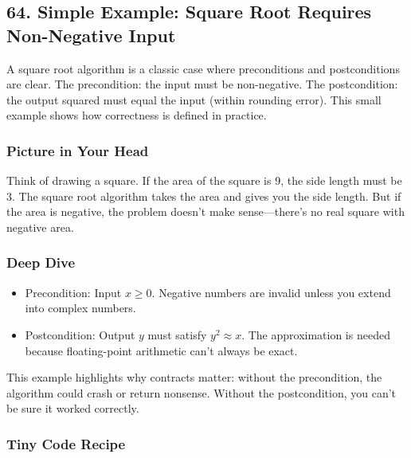 \documentclass[
  letterpaper,
  DIV=11,
  numbers=noendperiod]{scrreprt}
\providecommand{\tightlist}{%
  \setlength{\itemsep}{0pt}\setlength{\parskip}{0pt}}
\begin{document}
\subsection{64. Simple Example: Square Root Requires Non-Negative
Input}\label{simple-example-square-root-requires-non-negative-input}

A square root algorithm is a classic case where preconditions and
postconditions are clear. The precondition: the input must be
non-negative. The postcondition: the output squared must equal the input
(within rounding error). This small example shows how correctness is
defined in practice.

\subsubsection{Picture in Your Head}\label{picture-in-your-head-63}

Think of drawing a square. If the area of the square is 9, the side
length must be 3. The square root algorithm takes the area and gives you
the side length. But if the area is negative, the problem doesn't make
sense---there's no real square with negative area.

\subsubsection{Deep Dive}\label{deep-dive-33}

\begin{itemize}
\tightlist
\item
  Precondition: Input \(x \geq 0\). Negative numbers are invalid unless
  you extend into complex numbers.
\item
  Postcondition: Output \(y\) must satisfy \(y^2 \approx x\). The
  approximation is needed because floating-point arithmetic can't always
  be exact.
\end{itemize}

This example highlights why contracts matter: without the precondition,
the algorithm could crash or return nonsense. Without the postcondition,
you can't be sure it worked correctly.

\subsubsection{Tiny Code Recipe}\label{tiny-code-recipe-61}
\end{document}
